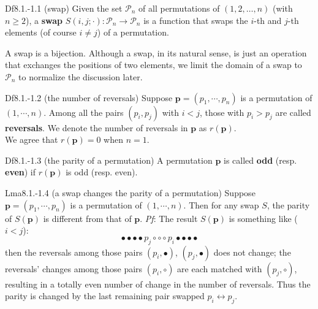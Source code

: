 \documentclass{article}
\begin{document}
\begin{Df}{Df8.1.-1.1 (swap)}
    Given the set $\mathcal{P}_n$ of all permutations of $(1,2,\dots,n)$ (with $n\geq 2$), a \textbf{swap} $S(i,j; \cdot): \mathcal{P}_n\to\mathcal{P}_n$ is a function that swaps the $i$-th and $j$-th elements (of course $i\neq j$) of a permutation. 
\end{Df}

\begin{Rmk}{}
    \textcolor{Th}{A swap is a bijection.} Although a swap, in its natural sense, is just an operation that exchanges the positions of two elements, we limit the domain of a swap to $\mathcal{P}_n$ to normalize the discussion later.
\end{Rmk}

\begin{Df}{Df8.1.-1.2 (the number of reversals)}
    Suppose $\pmb{p} = (p_1, \cdots, p_n)$ is a permutation of $(1,\cdots,n)$. Among all the pairs $(p_i, p_j)$ with $i<j$, those with $p_i>p_j$ are called \textbf{reversals}. We denote the number of reversals in $\pmb{p}$ as $r(\pmb{p})$. \\
    We agree that $r(\pmb{p}) = 0$ when $n=1$.
\end{Df}

\begin{Df}{Df8.1.-1.3 (the parity of a permutation)}
    A permutation $\pmb{p}$ is called \textbf{odd} (resp. \textbf{even}) if $r(\pmb{p})$ is odd (resp. even). 
\end{Df}

\begin{Th}{Lma8.1.-1.4 (a swap changes the parity of a permutation)}
    Suppose $\pmb{p} = (p_1, \cdots, p_n)$ is a permutation of $(1,\cdots,n)$. Then for any swap $S$, the parity of $S(\pmb{p})$ is different from that of $\pmb{p}$.
    \tcblower
    \textit{Pf}: The result $S(\pmb{p})$ is something like ($i<j$):
    $$ \bullet\bullet\bullet\bullet p_j\circ\circ\circ p_i\bullet\bullet\bullet\bullet $$
    then the reversals among those pairs $(p_i,\bullet)$, $(p_j,\bullet)$ does not change; the reversals' changes among those pairs $(p_i, \circ)$ are each matched with $(p_j, \circ)$, resulting in a totally even number of change in the number of reversals. Thus the parity is changed by the last remaining pair swapped $p_i\leftrightarrow p_j$. 
\end{Th}
\end{document}
